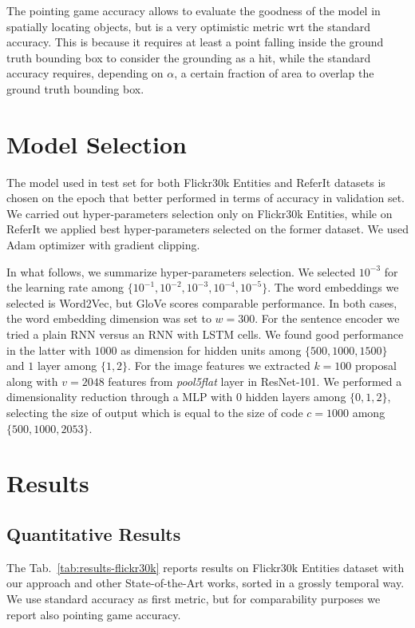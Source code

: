 The pointing game accuracy allows to evaluate the goodness of the
model in spatially locating objects, but is a very optimistic metric
wrt the standard accuracy. This is because it requires at least a
point falling inside the ground truth bounding box to consider the
grounding as a hit, while the standard accuracy requires, depending on
$\alpha$, a certain fraction of area to overlap the ground truth
bounding box.

\section{Model Selection}

The model used in test set for both Flickr30k Entities and ReferIt
datasets is chosen on the epoch that better performed in terms of
accuracy in validation set. We carried out hyper-parameters selection
only on Flickr30k Entities, while on ReferIt we applied best
hyper-parameters selected on the former dataset. We used Adam
optimizer with gradient clipping.

In what follows, we summarize hyper-parameters selection. We selected
$10^{-3}$ for the learning rate among $\{ 10^{-1}, 10^{-2}, 10^{-3},
10^{-4}, 10^{-5} \}$. The word embeddings we selected is Word2Vec, but
GloVe scores comparable performance. In both cases, the word embedding
dimension was set to $w = 300$. For the sentence encoder we tried a
plain RNN versus an RNN with LSTM cells. We found good performance in
the latter with $1000$ as dimension for hidden units among $\{ 500,
1000, 1500 \}$  and $1$ layer among $\{ 1, 2 \}$. For the image
features we extracted $k = 100$ proposal along with $v = 2048$
features from \textit{pool5\textunderscore flat} layer in ResNet-101.
We performed a dimensionality reduction through a MLP with $0$ hidden
layers among $\{ 0, 1, 2 \}$, selecting the size of output which is
equal to the size of code $c = 1000$ among $\{ 500, 1000, 2053 \}$.

\section{Results}
\label{sec:results}

\subsection{Quantitative Results}

The Tab.~\ref{tab:results-flickr30k} reports results on Flickr30k
Entities dataset with our approach and other State-of-the-Art works,
sorted in a grossly temporal way. We use standard accuracy as first
metric, but for comparability purposes we report also pointing game
accuracy.

